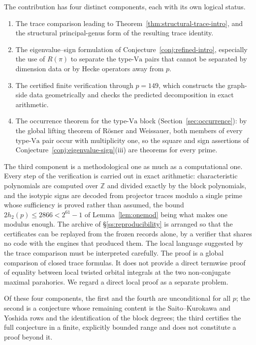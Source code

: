 \documentclass[11pt]{amsart}
\theoremstyle{plain}
\theoremstyle{definition}
\newcommand{\Z}{\mathbb{Z}}
\newcommand{\Va}{\mathrm{Va}}
\providecommand{\Va}{\mathrm{Va}}
\begin{document}
	The contribution has four distinct components, each with its own logical
	status.
	
	\begin{enumerate}[label=\textup{(\roman*)},leftmargin=2.5em]
		\item The trace comparison leading to
		Theorem~\ref{thm:structural-trace-intro}, and the structural
		principal-genus form of the resulting trace identity.
		\item The eigenvalue--sign formulation of
		Conjecture~\ref{conj:refined-intro}, especially the use of $R(\pi)$ to
		separate the type-$\mathrm{Va}$ pairs that cannot be separated by
		dimension data or by Hecke operators away from $p$.
		\item The certified finite verification through $p=149$, which constructs
		the graph-side data geometrically and checks the predicted decomposition in
		exact arithmetic.
		\item The occurrence theorem for the type-$\Va$ block
		(Section~\ref{sec:occurrence}): by the global lifting theorem of
		R\"osner and Weissauer, both members of every type-$\Va$ pair occur
		with multiplicity one, so the square and sign assertions of
		Conjecture~\ref{conj:eigenvalue-sign}\textup{(iii)} are theorems for
		every prime.
	\end{enumerate}
	The third component is a methodological one as much as a computational one.
	Every step of the verification is carried out in exact arithmetic:
	characteristic polynomials are computed over $\Z$ and divided exactly by the
	block polynomials, and the isotypic signs are decoded from projector traces
	modulo a single prime whose sufficiency is proved rather than assumed, the
	bound $2h_2(p)\le2866<2^{61}-1$ of Lemma~\ref{lem:onemod} being what makes
	one modulus enough. The archive of \S\ref{ss:reproducibility} is arranged so
	that the certificates can be replayed from the frozen records alone, by a
	verifier that shares no code with the engines that produced them.
	The local language suggested by the trace comparison must be interpreted
	carefully. The proof is a global comparison of closed trace formulas. It
	does not provide a direct termwise proof of equality between local twisted
	orbital integrals at the two non-conjugate maximal parahorics. We regard a
	direct local proof as a separate problem.
	
	Of these four components, the first and the fourth are unconditional for all $p$; the second is a conjecture whose remaining content is the Saito--Kurokawa and Yoshida rows and the identification of the block degrees; the third certifies the full conjecture in a finite, explicitly bounded range and does not constitute a proof beyond it.
	
\end{document}
